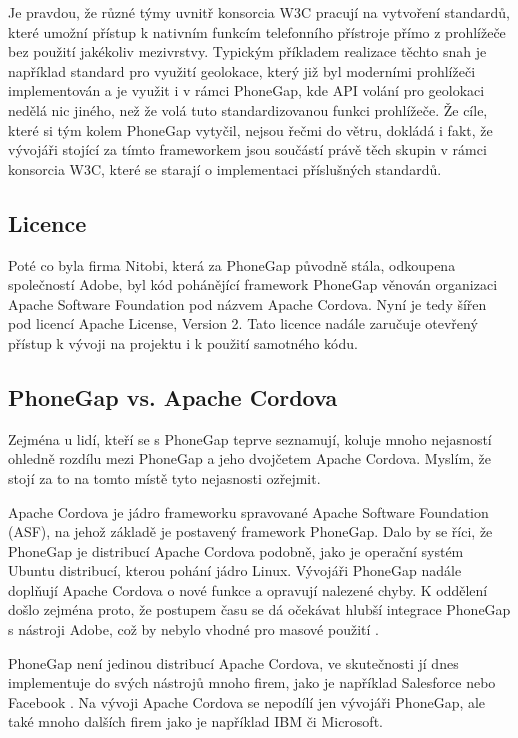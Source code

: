Je pravdou, že různé týmy uvnitř konsorcia W3C pracují na vytvoření standardů, které umožní přístup k nativním funkcím telefonního přístroje přímo z prohlížeče bez použití jakékoliv mezivrstvy. Typickým příkladem realizace těchto snah je například standard pro využití geolokace, který již byl moderními prohlížeči implementován a je využit i v rámci PhoneGap, kde API volání pro geolokaci nedělá nic jiného, než že volá tuto standardizovanou funkci prohlížeče. Že cíle, které si tým kolem PhoneGap vytyčil, nejsou řečmi do větru, dokládá i fakt, že vývojáři stojící za tímto frameworkem jsou součástí právě těch skupin v rámci konsorcia W3C, které se starají o implementaci příslušných standardů.

\subsection{Licence}
Poté co byla firma Nitobi, která za PhoneGap původně stála, odkoupena společností Adobe, byl kód pohánějící framework PhoneGap věnován organizaci Apache Software Foundation pod názvem Apache Cordova. Nyní je tedy šířen pod licencí Apache License, Version 2. Tato licence nadále zaručuje otevřený přístup k vývoji na projektu i k použití samotného kódu.

\subsection{PhoneGap vs. Apache Cordova}
Zejména u lidí, kteří se s PhoneGap teprve seznamují, koluje mnoho nejasností ohledně rozdílu mezi PhoneGap a jeho dvojčetem Apache Cordova. Myslím, že stojí za to na tomto místě tyto nejasnosti ozřejmit.

Apache Cordova je jádro frameworku spravované Apache Software Foundation (ASF), na jehož základě je postavený framework PhoneGap. Dalo by se říci, že PhoneGap je distribucí Apache Cordova podobně, jako je operační systém Ubuntu distribucí, kterou pohání jádro Linux. Vývojáři PhoneGap nadále doplňují Apache Cordova o nové funkce a opravují nalezené chyby. K oddělení došlo zejména proto, že postupem času se dá očekávat hlubší integrace PhoneGap s nástroji Adobe, což by nebylo vhodné pro masové použití \cite{cordova_name}. 

PhoneGap není jedinou distribucí Apache Cordova, ve skutečnosti jí dnes implementuje do svých nástrojů mnoho firem, jako je například Salesforce nebo Facebook \cite{cordova_name}. Na vývoji Apache Cordova se nepodílí jen vývojáři PhoneGap, ale také mnoho dalších firem jako je například IBM či Microsoft.

